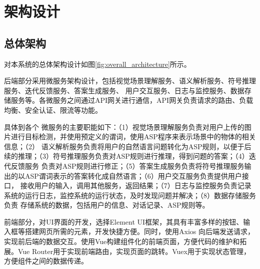 \section{架构设计}
\subsection{总体架构}
对本系统的总体架构设计如图\ref{fig:overall_architecture}所示。

后端部分采用微服务架构设计，包括视觉场景理解服务、语义解析服务、符号推理服务、迭代反馈服务、答案生成服务、
用户交互服务、日志与监控服务、数据存储服务等。各微服务之间通过API网关进行通信，API网关负责请求的路由、负载均衡、安全认证、限流等功能。

具体到各个
微服务的主要职能如下：（1）视觉场景理解服务负责对用户上传的图片进行目标检测，并使用预定义的谓词，使用ASP程序来表示场景中的物体的相关信息；（2）
语义解析服务负责将用户的自然语言问题转化为ASP规则，以便于后续的推理；（3）符号推理服务负责对ASP规则进行推理，得到问题的答案；（4）迭代反馈服务
负责对ASP规则进行修正；（5）答案生成服务负责将符号推理服务输出的以ASP谓词表示的答案转化成自然语言；（6）用户交互服务负责提供用户接口，
接收用户的输入，调用其他服务，返回结果；（7）日志与监控服务负责记录系统的运行日志，监控系统的运行状态，及时发现问题并解决；（8）数据存储服务负责
存储系统的数据，包括用户的信息、对话记录、ASP规则等。

前端部分，对UI界面的开发，选择Element UI框架，其具有丰富多样的按钮、输入框等搭建网页所需的元素，开发快捷方便。同时，使用Axios
向后端发送请求，实现前后端的数据交互。使用Vue构建组件化的前端页面，方便代码的维护和拓展。Vue Router用于实现前端路由，实现页面的跳转。Vuex用于实现状态管理，方便组件之间的数据传递。

